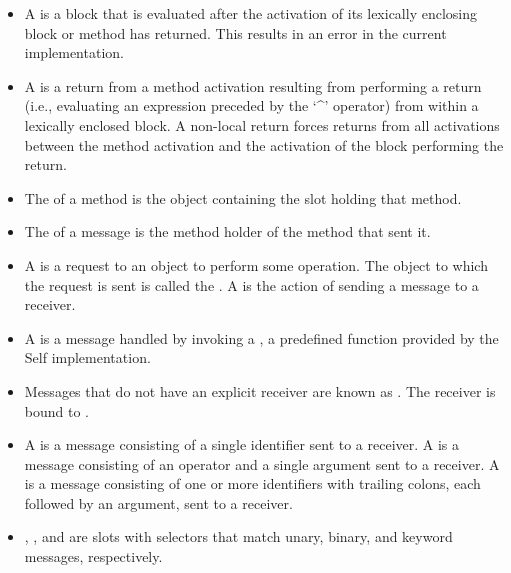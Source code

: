 \documentclass[letterpaper,10pt,english]{sphinxmanual}
\begin{document}
\begin{itemize}
\item {} 
A  is a block that is evaluated after the activation of its lexically enclosing block or method has returned. This results in an error in the current implementation.

\item {} 
A  is a return from a method activation resulting from performing a return (i.e., evaluating an expression preceded by the ‘\textasciicircum{}’ operator) from within a lexically enclosed block. A non-local return forces returns from all activations between the method activation and the activation of the block performing the return.

\item {} 
The  of a method is the object containing the slot holding that method.

\item {} 
The  of a message is the method holder of the method that sent it.

\item {} 
A  is a request to an object to perform some operation. The object to which the request is sent is called the . A  is the action of sending a message to a receiver.

\item {} 
A  is a message handled by invoking a , a predefined function provided by the Self implementation.

\item {} 
Messages that do not have an explicit receiver are known as . The receiver is bound to .

\item {} 
A  is a message consisting of a single identifier sent to a receiver. A  is a message consisting of an operator and a single argument sent to a receiver. A  is a message consisting of one or more identifiers with trailing colons, each followed by an argument, sent to a receiver.

\item {} 
, , and  are slots with selectors that match unary, binary, and keyword messages, respectively.


\end{itemize}
\end{document}
